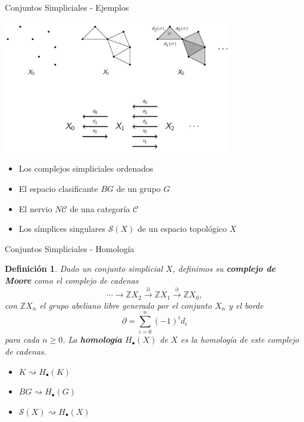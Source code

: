 \documentclass[11pt]{beamer}
\newcommand{\Z}{\mathbb{Z}}
\newtheorem{defs}{Definición}
\begin{document}
\begin{frame}{Conjuntos Simpliciales - Ejemplos}
\begin{center}
\includegraphics[width=0.75\textwidth]{SimplicialSetsIdea.jpg}
\end{center}
\begin{itemize}
\item <2-> Los complejos simpliciales ordenados
\item <3-> El espacio clasificante $BG$ de un grupo $G$
\item <4-> El nervio $N\mathscr{C}$ de una categoría $\mathscr{C}$
\item <5-> Los símplices singulares $\mathscr{S}(X)$ de un espacio topológico $X$
\end{itemize}
\end{frame}

\begin{frame}{Conjuntos Simpliciales  - Homología}
\begin{defs} Dado un conjunto simplicial $X$, definimos su \textbf{complejo de Moore} como el complejo de cadenas
\[
\cdots \to \Z X_2 \xrightarrow{\partial} \Z X_1 \xrightarrow{\partial} \Z X_0,
\]
con $\Z X_n$ el grupo abeliano libre generado por el conjunto $X_n$ y el borde
\[
\partial = \sum_{i=0}^n(-1)^i d_i
\]
para cada $n \geq 0$. La \textbf{homología} $H_\bullet(X)$ de $X$ es la homología de este complejo de cadenas.
\end{defs}
\begin{itemize}
\item <2-> $K \rightsquigarrow H_\bullet(K)$
\item <3-> $BG \rightsquigarrow H_\bullet(G)$
\item <4-> $\mathscr{S}(X) \rightsquigarrow H_\bullet(X)$
\end{itemize}
\end{frame}
\end{document}
